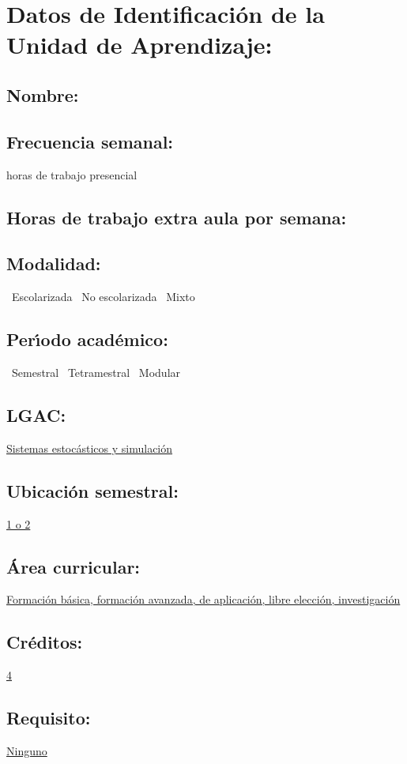 \documentclass[10 pt]{article}
\begin{document}

\section{Datos de Identificaci\'{o}n de la Unidad de Aprendizaje:}
\subsection{Nombre:} 
\subsection{Frecuencia semanal:} horas de trabajo presencial 
\subsection{Horas de trabajo extra aula por semana:} 
\subsection{Modalidad:} \yes~Escolarizada \no~No escolarizada \no~Mixto
\subsection{Per\'{\i}odo acad\'{e}mico:} \yes~Semestral
\no~Tetramestral \no~Modular
\subsection{LGAC:} \underline{Sistemas estoc\'{a}sticos y simulaci\'{o}n}
\subsection{Ubicaci\'{o}n semestral:} \underline{1 o 2}
\subsection{\'{A}rea curricular:} \underline{Formaci\'{o}n b\'{a}sica,
  formaci\'{o}n avanzada, de aplicaci\'{o}n, libre elecci\'{o}n, investigaci\'{o}n}
\subsection{Cr\'{e}ditos:} \underline{4}
\subsection{Requisito:} \underline{Ninguno}
\end{document}
